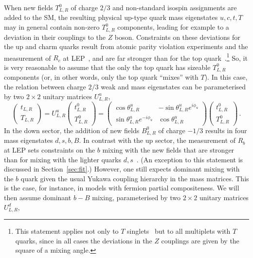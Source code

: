 \documentclass[12pt,a4paper]{article}
\begin{document}
When new fields $T_{L,R}^0$ of charge $2/3$ and non-standard isospin assignments are added to the SM, the resulting physical up-type quark mass eigenstates $u,c,t,T$ may in general contain non-zero $T_{L,R}^0$ components, leading for example to a deviation in their couplings to the $Z$ boson. Constraints on these deviations for the up and charm quarks result from atomic parity violation experiments and the measurement of $R_c$ at LEP~\cite{Beringer:1900zz}, and are far stronger than for the top quark~\cite{AguilarSaavedra:2002kr}.\footnote{This statement applies not only to $T$ singlets~\cite{AguilarSaavedra:2002kr} but to all multiplets with $T$ quarks, since in all cases the deviations in the $Z$ couplings are given by the square of a mixing angle.}
 So, it is very reasonable to assume that the only the top quark has sizeable $T_{L,R}^0$ components (or, in other words, only the top quark ``mixes'' with $T$). In this case, the relation between charge $2/3$ weak and mass eigenstates can be parameterised by two $2 \times 2$ unitary matrices $U_{L,R}^u$,
\begin{equation}
\left(\! \begin{array}{c} t_{L,R} \\ T_{L,R} \end{array} \!\right) =
U_{L,R}^u \left(\! \begin{array}{c} t^0_{L,R} \\ T^0_{L,R} \end{array} \!\right)
= \left(\! \begin{array}{cc} \cos \theta_{L,R}^u & -\sin \theta_{L,R}^u e^{i \phi_u} \\ \sin \theta_{L,R}^u e^{-i \phi_u} & \cos \theta_{L,R}^u \end{array}
\!\right)
\left(\! \begin{array}{c} t^0_{L,R} \\ T^0_{L,R} \end{array} \!\right) \,.
\label{ec:mixu}
\end{equation}
In the down sector, the addition of new fields $B_{L,R}^0$ of charge $-1/3$ results in four mass eigenstates $d,s,b,B$. In contrast with the up sector, the measurement of $R_b$ at LEP sets constraints on the $b$ mixing with the new fields that are stronger than for mixing with the lighter quarks $d,s$~\cite{AguilarSaavedra:2002kr}. (An exception to this statement is discussed in Section~\ref{sec:fit}.) However, one still expects dominant mixing with the $b$ quark given the usual Yukawa coupling hierarchy in the mass matrices. This is the case, for instance, in models with fermion partial compositeness. We will then assume dominant $b-B$ mixing, parameterised by two $2 \times 2$ unitary matrices $U_{L,R}^d$,
\end{document}
